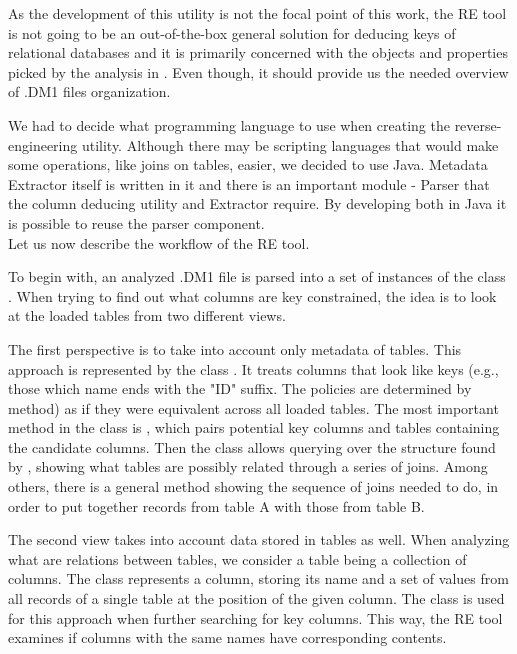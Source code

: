 As the development of this utility is not the focal point of this work, the RE tool is not going to be an out-of-the-box general solution for deducing keys of relational databases and it is primarily concerned with the objects and properties picked by the analysis in . Even though, it should provide us the needed overview of .DM1 files organization.

We had to decide what programming language to use when creating the reverse-engineering utility. Although there may be scripting languages that would make some operations, like joins on tables, easier, we decided to use Java. Metadata Extractor itself is written in it and there is an important module - Parser that the column deducing utility and Extractor require. By developing both in Java it is possible to reuse the parser component. \\

Let us now describe the workflow of the RE tool.

To begin with, an analyzed .DM1 file is parsed into a set of instances of the class . When trying to find out what columns are key constrained, the idea is to look at the loaded tables from two different views.

The first perspective is to take into account only metadata of tables. 
This approach is represented by the class . 
It treats columns that look like keys (e.g., those which name ends with the "ID" suffix. The policies are determined by  method) as if they were equivalent across all loaded tables.
The most important method in the class is , which pairs potential key columns and tables containing the candidate columns.
Then the class  allows querying over the structure found by , showing what tables are possibly related through a series of joins.
Among others, there is a general method  showing the sequence of joins needed to do, in order to put together records from table A with those from table B.

The second view takes into account data stored in tables as well. 
When analyzing what are relations between tables, we consider a table being a collection of columns. The  class represents a column, storing its name and a set of values from all records of a single table at the position of the given column.
The  class is used for this approach when further searching for key columns.
This way, the RE tool examines if columns with the same names have corresponding contents.

